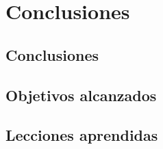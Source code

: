 \chapter{Conclusiones}
\label{ch:conclusions}


\section{Conclusiones}

\section{Objetivos alcanzados}

\section{Lecciones aprendidas}
